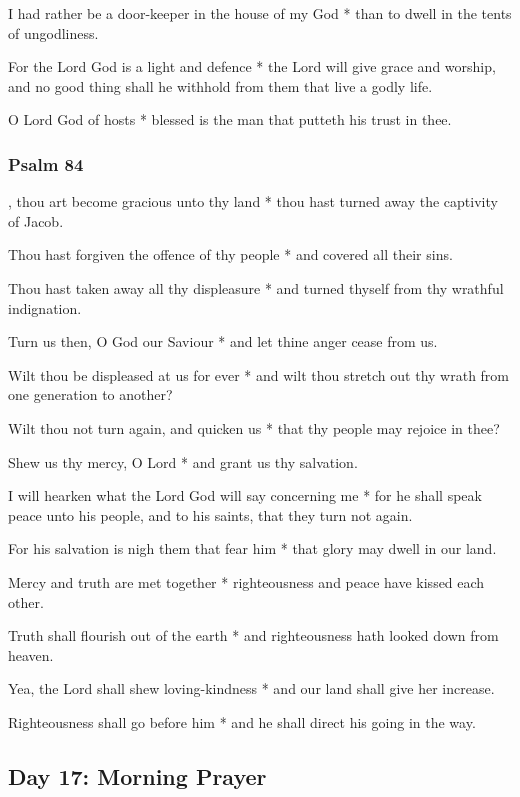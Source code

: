 I had rather be a door-keeper in the house of my God * than to dwell in the tents of ungodliness.

For the Lord God is a light and defence * the Lord will give grace and worship, and no good thing shall he withhold from them that live a godly life.

O Lord God of hosts * blessed is the man that putteth his trust in thee.

\subsubsection{Psalm 84}


, thou art become gracious unto thy land * thou hast turned away the captivity of Jacob.

Thou hast forgiven the offence of thy people * and covered all their sins.

Thou hast taken away all thy displeasure * and turned thyself from thy wrathful indignation.

Turn us then, O God our Saviour * and let thine anger cease from us.

Wilt thou be displeased at us for ever * and wilt thou stretch out thy wrath from one generation to another?

Wilt thou not turn again, and quicken us * that thy people may rejoice in thee?

Shew us thy mercy, O Lord * and grant us thy salvation.

I will hearken what the Lord God will say concerning me * for he shall speak peace unto his people, and to his saints, that they turn not again.

For his salvation is nigh them that fear him * that glory may dwell in our land.

Mercy and truth are met together * righteousness and peace have kissed each other.

Truth shall flourish out of the earth * and righteousness hath looked down from heaven.

Yea, the Lord shall shew loving-kindness * and our land shall give her increase.

Righteousness shall go before him * and he shall direct his going in the way.

\subsection{Day 17: Morning Prayer}

